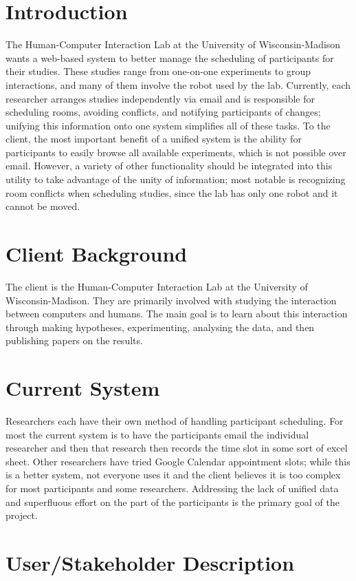 \section{Introduction}
The Human-Computer Interaction Lab at the University of Wisconsin-Madison wants a web-based system to better manage the scheduling of participants for their studies.  These studies range from one-on-one experiments to group interactions, and many of them involve the robot used by the lab.  Currently, each researcher arranges studies independently via email and is responsible for scheduling rooms, avoiding conflicts, and notifying participants of changes; unifying this information onto one system simplifies all of these tasks.  To the client, the most important benefit of a unified system is the ability for participants to easily browse all available experiments, which is not possible over email.  However, a variety of other functionality should be integrated into this utility to take advantage of the unity of information; most notable is recognizing room conflicts when scheduling studies, since the lab has only one robot and it cannot be moved.

\section{Client Background}
The client is the Human-Computer Interaction Lab at the University of Wisconsin-Madison. They are primarily involved with studying the interaction between computers and humans. The main goal is to learn about this interaction through making hypotheses, experimenting, analysing the data, and then publishing papers on the results.

\section{Current System}
Researchers each have their own method of handling participant scheduling. For most the current system is to have the participants email the individual researcher and then that research then records the time slot in some sort of excel sheet. Other researchers have tried Google Calendar appointment slots; while this is a better system, not everyone uses it and the client believes it is too complex for most participants and some researchers.  Addressing the lack of unified data and superfluous effort on the part of the participants is the primary goal of the project.

\section{User/Stakeholder Description}
